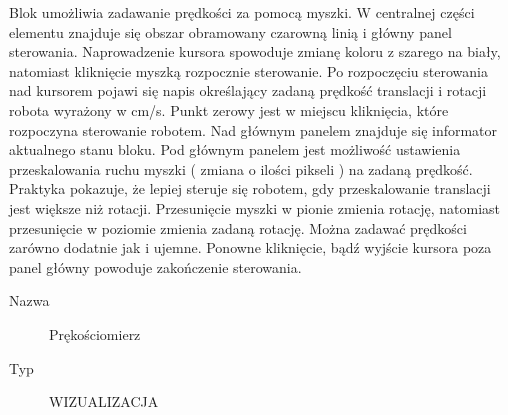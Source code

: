 \documentclass[eng,printmode]{mgr}
\begin{document}
Blok umożliwia zadawanie prędkości za pomocą myszki. W centralnej części elementu znajduje się obszar obramowany czarowną linią i główny panel sterowania. Naprowadzenie kursora spowoduje zmianę koloru z szarego na biały, natomiast kliknięcie myszką rozpocznie sterowanie. Po rozpoczęciu sterowania nad kursorem pojawi się napis określający zadaną prędkość translacji i rotacji robota wyrażony w cm/s. Punkt zerowy jest w miejscu kliknięcia, które rozpoczyna sterowanie robotem. Nad głównym panelem znajduje się informator aktualnego stanu bloku. Pod głównym panelem jest możliwość ustawienia przeskalowania ruchu myszki ( zmiana o ilości pikseli ) na zadaną prędkość. Praktyka pokazuje, że lepiej steruje się robotem, gdy przeskalowanie translacji jest większe niż rotacji.  Przesunięcie myszki w pionie zmienia rotację, natomiast przesunięcie w poziomie zmienia zadaną rotację. Można zadawać prędkości zarówno dodatnie jak i ujemne. Ponowne kliknięcie, bądź wyjście kursora poza panel główny powoduje zakończenie sterowania.
\newpage
\begin{description}
  \item[Nazwa] Prękościomierz
  \item[Typ] WIZUALIZACJA
\end{description}
\end{document}
